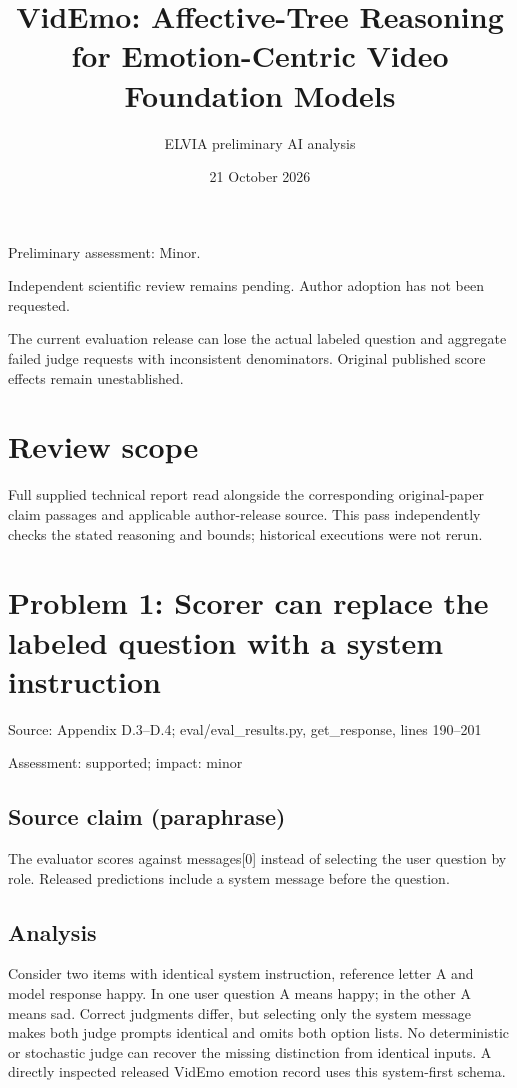\documentclass[11pt]{article}
\begin{document}
\title{VidEmo: Affective-Tree Reasoning for Emotion-Centric Video Foundation Models}

\author{ELVIA preliminary AI analysis}\date{21 October 2026}\maketitle

Preliminary assessment: Minor.\par

Independent scientific review remains pending. Author adoption has not been requested.

The current evaluation release can lose the actual labeled question and aggregate failed judge requests with inconsistent denominators. Original published score effects remain unestablished.

\section*{Review scope}

Full supplied technical report read alongside the corresponding original-paper claim passages and applicable author-release source. This pass independently checks the stated reasoning and bounds; historical executions were not rerun.

\section*{Problem 1: Scorer can replace the labeled question with a system instruction}

Source: Appendix D.3–D.4; eval/eval\_results.py, get\_response, lines 190–201

Assessment: supported; impact: minor

\subsection*{Source claim (paraphrase)}

The evaluator scores against messages[0] instead of selecting the user question by role. Released predictions include a system message before the question.

\subsection*{Analysis}

Consider two items with identical system instruction, reference letter A and model response happy. In one user question A means happy; in the other A means sad. Correct judgments differ, but selecting only the system message makes both judge prompts identical and omits both option lists. No deterministic or stochastic judge can recover the missing distinction from identical inputs. A directly inspected released VidEmo emotion record uses this system-first schema.
\end{document}
